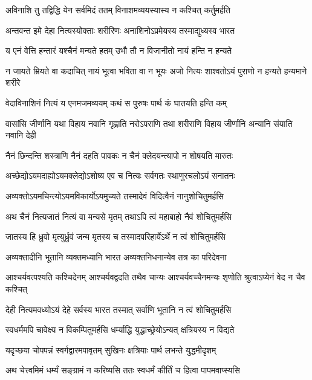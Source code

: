 \twolineshloka
{अविनाशि तु तद्विद्धि येन सर्वमिदं ततम्}
{विनाशमव्ययस्यास्य न कश्चित् कर्तुमर्हति}%

\twolineshloka
{अन्तवन्त इमे देहा नित्यस्योक्ताः शरीरिणः}
{अनाशिनोऽप्रमेयस्य तस्माद्युध्यस्व भारत}%

\twolineshloka
{य एनं वेत्ति हन्तारं यश्चैनं मन्यते हतम्}
{उभौ तौ न विजानीतो नायं हन्ति न हन्यते}%

\fourlineindentedshloka
{न जायते म्रियते वा कदाचित्}
{नायं भूत्वा भविता वा न भूयः}
{अजो नित्यः शाश्वतोऽयं पुराणो}
{न हन्यते हन्यमाने शरीरे}%

\twolineshloka
{वेदाविनाशिनं नित्यं य एनमजमव्ययम्}
{कथं स पुरुषः पार्थ कं घातयति हन्ति कम्}%

\fourlineindentedshloka
{वासांसि जीर्णानि यथा विहाय}
{नवानि गृह्णाति नरोऽपराणि}
{तथा शरीराणि विहाय जीर्णानि}
{अन्यानि संयाति नवानि देही}%

\twolineshloka
{नैनं छिन्दन्ति शस्त्राणि नैनं दहति पावकः}
{न चैनं क्लेदयन्त्यापो न शोषयति मारुतः}%

\twolineshloka
{अच्छेद्योऽयमदाह्योऽयमक्लेद्योऽशोष्य एव च}
{नित्यः सर्वगतः स्थाणुरचलोऽयं सनातनः}%

\twolineshloka
{अव्यक्तोऽयमचिन्त्योऽयमविकार्योऽयमुच्यते}
{तस्मादेवं विदित्वैनं नानुशोचितुमर्हसि}%

\twolineshloka
{अथ चैनं नित्यजातं नित्यं वा मन्यसे मृतम्}
{तथाऽपि त्वं महाबाहो नैवं शोचितुमर्हसि}%

\twolineshloka
{जातस्य हि ध्रुवो मृत्युर्ध्रुवं जन्म मृतस्य च}
{तस्मादपरिहार्येऽर्थे न त्वं शोचितुमर्हसि}%

\twolineshloka
{अव्यक्तादीनि भूतानि व्यक्तमध्यानि भारत}
{अव्यक्तनिधनान्येव तत्र का परिदेवना}%

\fourlineindentedshloka
{आश्चर्यवत्पश्यति कश्चिदेनम्}
{आश्चर्यवद्वदति तथैव चान्यः}
{आश्चर्यवच्चैनमन्यः शृणोति}
{श्रुत्वाऽप्येनं वेद न चैव कश्चित्}%

\twolineshloka
{देही नित्यमवध्योऽयं देहे सर्वस्य भारत}
{तस्मात् सर्वाणि भूतानि न त्वं शोचितुमर्हसि}%

\twolineshloka
{स्वधर्ममपि चावेक्ष्य न विकम्पितुमर्हसि}
{धर्म्याद्धि युद्धाच्छ्रेयोऽन्यत् क्षत्रियस्य न विद्यते}%

\twolineshloka
{यदृच्छया चोपपन्नं स्वर्गद्वारमपावृतम्}
{सुखिनः क्षत्रियाः पार्थ लभन्ते युद्धमीदृशम्}%

\twolineshloka
{अथ चेत्त्वमिमं धर्म्यं सङ्ग्रामं न करिष्यसि}
{ततः स्वधर्मं कीर्तिं च हित्वा पापमवाप्स्यसि}%

